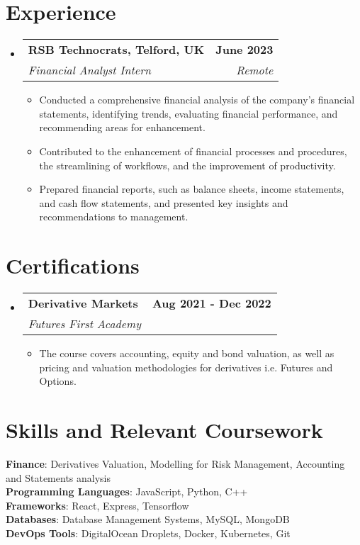 \documentclass[letterpaper,11pt]{article}
\makeatletter
\newcommand{\resumeItem}[1]{
  \item\small{
    {#1 \vspace{-2pt}}
  }
}
\newcommand{\resumeSubheading}[4]{
  \vspace{-2pt}\item
    \begin{tabular*}{1.0\textwidth}[t]{l@{\extracolsep{\fill}}r}
      \textbf{#1} & \textbf{\small #2} \\
      \textit{\small#3} & \textit{\small #4} \\
    \end{tabular*}\vspace{-7pt}
}
\newcommand{\resumeSubHeadingListStart}{\begin{itemize}[leftmargin=0.0in, label={}]}
\newcommand{\resumeSubHeadingListEnd}{\end{itemize}}
\newcommand{\resumeItemListStart}{\begin{itemize}}
\newcommand{\resumeItemListEnd}{\end{itemize}\vspace{-5pt}}
\makeatother
\begin{document}
 \section{Experience}
\resumeSubHeadingListStart
\resumeSubheading
{RSB Technocrats, Telford, UK }{June 2023 }
{Financial Analyst Intern}{ Remote}
\resumeItemListStart
\resumeItem{Conducted a comprehensive financial analysis of the company's financial statements, identifying trends, evaluating financial performance, and recommending areas for enhancement.}
\resumeItem{Contributed to the enhancement of financial processes and procedures, the streamlining of workflows, and the improvement of productivity.}
 \resumeItem{Prepared financial reports, such as balance sheets, income statements, and cash flow statements, and presented key insights and recommendations to management.}
\resumeItemListEnd
\resumeSubHeadingListEnd
\vspace{-12pt}
 \section{Certifications}
\resumeSubHeadingListStart
\resumeSubheading
{Derivative Markets}{Aug 2021 - Dec 2022}
{Futures First Academy}{}
\resumeItemListStart
\resumeItem{The course covers accounting, equity and bond valuation, as well as pricing and valuation methodologies for derivatives i.e. Futures and Options.}
\resumeItemListEnd
\resumeSubHeadingListEnd
\vspace{-14pt}
\section{Skills and Relevant Coursework}
 \begin{itemize}[leftmargin=0.15in, label={}]
    \small{\item{
    \textbf{Finance}{: Derivatives Valuation, Modelling for Risk Management, Accounting and Statements analysis}\\
     \textbf{Programming Languages}{: JavaScript, Python, C++}\\
    
     \textbf{Frameworks}{: React, Express, Tensorflow}\\
    \textbf{Databases}{: Database Management Systems, MySQL, MongoDB }\\ 
     \textbf{DevOps Tools}{: DigitalOcean Droplets, Docker, Kubernetes, Git}\\
         
}}
 \end{itemize}
 \vspace{-14pt}
\end{document}

